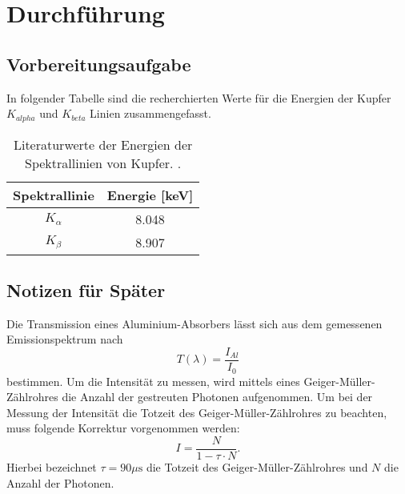 \section{Durchführung}
\label{sec:Durchführung}
\subsection{Vorbereitungsaufgabe}
\label{sec:vorbereitung}
In folgender Tabelle sind die recherchierten Werte für die Energien der Kupfer $K_{alpha}$ und $K_{beta}$
Linien zusammengefasst.
\begin{table}[H]
    \centering
    \caption{Literaturwerte der Energien der Spektrallinien von Kupfer. \cite{AP03}.}
    \label{tab:brechungsind}
    \begin{tabular}{S S}
      \toprule
      {Spektrallinie} & {Energie [\si{\kilo\electronvolt}]} \\
      \midrule
    {$K_{\alpha}$} & 8.048 \\
    {$K_{\beta} $} & 8.907 \\
      \bottomrule
    \end{tabular}
  \end{table}
\noindent
\subsection{Notizen für Später}
Die Transmission eines Aluminium-Absorbers lässt sich aus dem gemessenen Emissionspektrum nach
\begin{equation}
	T(\lambda) = \frac{I_{Al}}{I_0}
	\label{eqn:trans}
\end{equation}
bestimmen.
%
Um die Intensität zu messen, wird mittels eines Geiger-Müller-Zählrohres die Anzahl der gestreuten Photonen aufgenommen.
Um bei der Messung der Intensität die Totzeit des Geiger-Müller-Zählrohres zu beachten, muss folgende Korrektur vorgenommen werden:
\begin{equation*}
	I = \frac{N}{1 - \tau \cdot N}.
\end{equation*}
Hierbei bezeichnet $\tau = 90 \mu \si{\second}$ die Totzeit des Geiger-Müller-Zählrohres und $N$ die Anzahl der Photonen.
